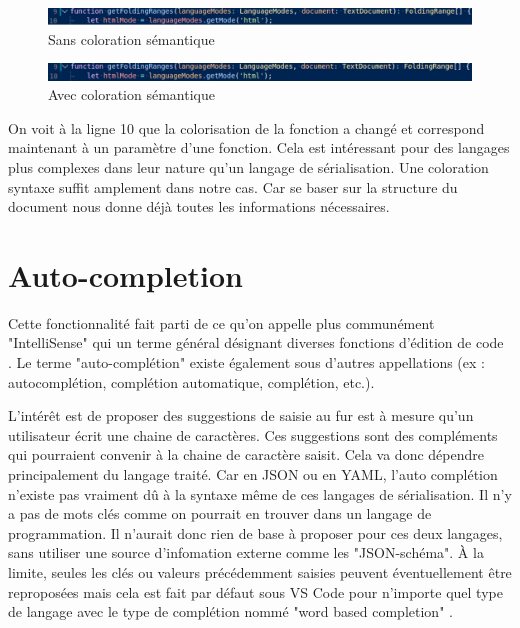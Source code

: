 \documentclass[
    iict, %
    il, %
]{heig-tb}
\begin{document}
\begin{figure}[!h]
    \begin{center}
        \includegraphics[width=15cm]{assets/figures/semantic-coloration-without.png}
    \end{center}
    \caption[Exemple sans coloration sémantique]{\label{semantic-coloration-without} Sans coloration sémantique}
\end{figure}

\begin{figure}[!h]
    \begin{center}
        \includegraphics[width=15cm]{assets/figures/semantic-coloration-with.png}
    \end{center}
    \caption[Exemple avec coloration sémantique ]{\label{semantic-coloration-with} Avec coloration sémantique }
\end{figure}

On voit à la ligne 10 que la colorisation de la fonction a changé et correspond maintenant à un paramètre d'une fonction.
Cela est intéressant pour des langages plus complexes dans leur nature qu'un langage de sérialisation. Une coloration syntaxe suffit amplement dans notre cas.
Car se baser sur la structure du document nous donne déjà toutes les informations nécessaires.

\section{Auto-completion}

Cette fonctionnalité fait parti de ce qu'on appelle plus communément "IntelliSense" qui un terme général désignant diverses fonctions d'édition de code \cite{intelliSense}.
Le terme "auto-complétion" existe également sous d'autres appellations (ex : autocomplétion, complétion automatique, complétion, etc.).

L'intérêt est de proposer des suggestions de saisie au fur est à mesure qu'un utilisateur écrit une chaine de caractères.
Ces suggestions sont des compléments qui pourraient convenir à la chaine de caractère saisit. Cela va donc dépendre principalement du langage traité.
Car en JSON ou en YAML, l'auto complétion n'existe pas vraiment dû à la syntaxe même de ces langages de sérialisation.
Il n'y a pas de mots clés comme on pourrait en trouver dans un langage de programmation.
Il n'aurait donc rien de base à proposer pour ces deux langages, sans utiliser une source d'infomation externe comme les "JSON-schéma".
À la limite, seules les clés ou valeurs précédemment saisies peuvent éventuellement être reproposées mais cela est fait par défaut sous VS Code pour n'importe quel type de langage
avec le type de complétion nommé "word based completion" \cite{word-based-completions}.
\end{document}
